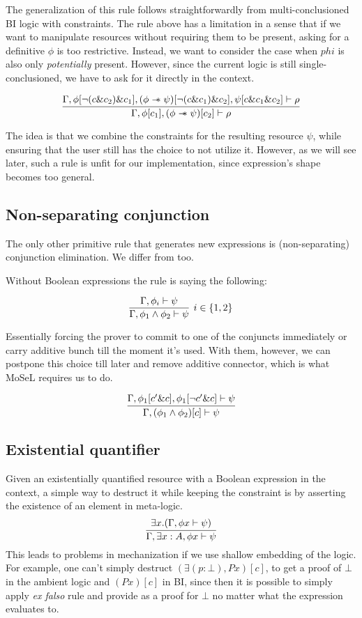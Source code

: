 The generalization of this rule follows straightforwardly from multi-conclusioned BI logic with constraints.
The rule above has a limitation in a sense that if we want to manipulate resources without requiring them to be present, asking for a definitive \(\phi\) is too restrictive.
Instead, we want to consider the case when \(phi\) is also only \emph{potentially} present.
However, since the current logic is still single-conclusioned, we have to ask for it directly in the context.

\[
\infer{\Gamma, \phi[c_1], (\phi \wand \psi)[c_2] \vdash \rho}
      {\Gamma, \phi[\neg (c \& c_2) \& c_1], (\phi \wand \psi)[\neg (c \& c_1) \& c_2], \psi[c \& c_1 \& c_2] \vdash \rho}
\]

The idea is that we combine the constraints for the resulting resource \(\psi\), while ensuring that the user still has the choice to not utilize it.
However, as we will see later, such a rule is unfit for our implementation, since expression's shape becomes too general.

\subsection{Non-separating conjunction}
\label{sec:non-separ-conj}

The only other primitive rule that generates new expressions is (non-separating) conjunction elimination.
We differ from \citet{harlandResourceDistributionBooleanConstraints2003} too.

Without Boolean expressions the rule is saying the following:

\[
\infer[ i \in \{1,2\} ]
      {\Gamma, \phi_1 \wedge \phi_2 \vdash \psi}
      {\Gamma, \phi_i \vdash \psi}
\]

Essentially forcing the prover to commit to one of the conjuncts immediately or carry additive bunch till the moment it's used.
With them, however, we can postpone this choice till later and remove additive connector, which is what MoSeL requires us to do.

\[
\infer{\Gamma, (\phi_1 \wedge \phi_2)[c] \vdash \psi}
      {\Gamma, \phi_1[c' \& c], \phi_1[\neg c' \& c] \vdash \psi}
\]

\subsection{Existential quantifier}
\label{subsec:exist-quant}

Given an existentially quantified resource with a Boolean expression in the context, a simple way to destruct it while keeping the constraint is by asserting the existence of an element in meta-logic.
\[\infer{\Gamma, \exists x : A, \phi x \vdash \psi}
        { \exists x. (\Gamma, \phi x \vdash \psi)}\]
This leads to problems in mechanization if we use shallow embedding of the logic.
For example, one can't simply destruct \((\exists (p : \bot), P x)[c]\), to get a proof of \(\bot\) in the ambient logic and \((P x)[c]\) in BI, since then it is possible to simply apply \emph{ex falso} rule and provide  as a proof for \(\bot\) no matter what the expression evaluates to.

